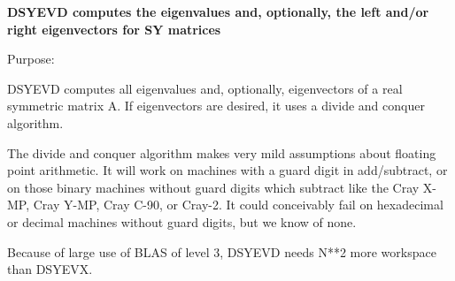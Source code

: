 {\bfseries  D\+S\+Y\+E\+V\+D computes the eigenvalues and, optionally, the left and/or right eigenvectors for S\+Y matrices} 

 \begin{DoxyParagraph}{Purpose\+: }
\begin{DoxyVerb} DSYEVD computes all eigenvalues and, optionally, eigenvectors of a
 real symmetric matrix A. If eigenvectors are desired, it uses a
 divide and conquer algorithm.

 The divide and conquer algorithm makes very mild assumptions about
 floating point arithmetic. It will work on machines with a guard
 digit in add/subtract, or on those binary machines without guard
 digits which subtract like the Cray X-MP, Cray Y-MP, Cray C-90, or
 Cray-2. It could conceivably fail on hexadecimal or decimal machines
 without guard digits, but we know of none.

 Because of large use of BLAS of level 3, DSYEVD needs N**2 more
 workspace than DSYEVX.\end{DoxyVerb}
 
\end{DoxyParagraph}

